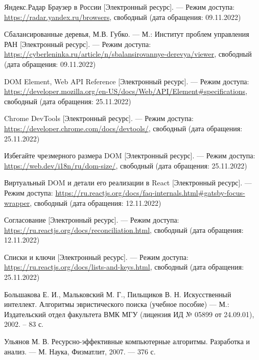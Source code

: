 \begin{thebibliography}{}
	Яндекс.Радар Браузер в России [Электронный ресурс]. --- Режим доступа:
	\url{https://radar.yandex.ru/browsers}, свободный (дата обращения: 09.11.2022)
	
	Сбалансированные деревья, М.В. Губко. --- М.: Институт проблем управления РАН [Электронный ресурс]. --- Режим доступа: \url{https://cyberleninka.ru/article/n/sbalansirovannye-derevya/viewer}, свободный (дата обращения: 09.11.2022)
	
	DOM Element, Web API Reference [Электронный ресурс]. --- Режим доступа: \url{https://developer.mozilla.org/en-US/docs/Web/API/Element#specifications}, свободный (дата обращения: 25.11.2022)
	
	Chrome DevTools [Электронный ресурс]. --- Режим доступа: \url{https://developer.chrome.com/docs/devtools/}, свободный (дата обращения: 25.11.2022)
	
	Избегайте чрезмерного размера DOM [Электронный ресурс]. --- Режим доступа: \url{https://web.dev/i18n/ru/dom-size/}, свободный (дата обращения: 25.11.2022)
	
	Виртуальный DOM и детали его реализации в React [Электронный ресурс]. --- Режим доступа: \url{https://ru.reactjs.org/docs/faq-internals.html#gatsby-focus-wrapper}, свободный (дата обращения: 12.11.2022)
	
	Согласование [Электронный ресурс]. --- Режим доступа: \url{https://ru.reactjs.org/docs/reconciliation.html}, свободный (дата обращения: 12.11.2022)
	
	Списки и ключи [Электронный ресурс]. --- Режим доступа: \url{https://ru.reactjs.org/docs/lists-and-keys.html}, свободный (дата обращения: 25.11.2022)
	
	Большакова Е. И., Мальковский М. Г., Пильщиков В. Н. Искусственный интеллект. Алгоритмы эвристического поиска (учебное пособие) --- М.: Издательский отдел факультета ВМК МГУ (лицензия ИД № 05899 от 24.09.01),
	2002. -- 83 с.
	
	Ульянов М. В. Ресурсно-эффективные компьютерные алгоритмы. Разработка и анализ. --- М. Наука, Физматлит, 2007. --- 376 с.
\end{thebibliography}
\endgroup

\pagebreak